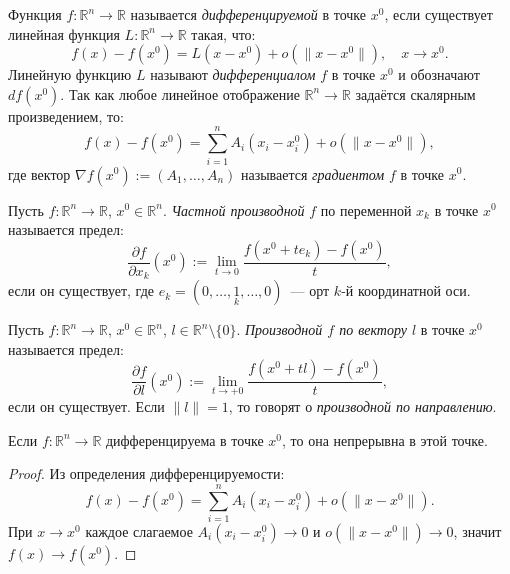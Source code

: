 


\begin{defn}
  Функция $f : \mathbb{R}^n \to \mathbb{R}$ называется \textit{дифференцируемой}
  в точке $x^0$, если существует линейная функция $L : \mathbb{R}^n \to \mathbb{R}$
  такая, что:
  \[
    f(x) - f(x^0) = L(x - x^0) + o(\|x - x^0\|), \quad x \to x^0.
  \]
  Линейную функцию $L$ называют \textit{дифференциалом} $f$ в точке $x^0$
  и обозначают $df(x^0)$. Так как любое линейное отображение
  $\mathbb{R}^n \to \mathbb{R}$ задаётся скалярным произведением, то:
  \[
    f(x) - f(x^0) = \sum_{i=1}^n A_i(x_i - x_i^0) + o(\|x - x^0\|),
  \]
  где вектор $\nabla f(x^0) := (A_1, \ldots, A_n)$ называется
  \textit{градиентом} $f$ в точке $x^0$.
\end{defn}

\begin{defn}
  Пусть $f : \mathbb{R}^n \to \mathbb{R}$, $x^0 \in \mathbb{R}^n$.
  \textit{Частной производной} $f$ по переменной $x_k$ в точке $x^0$
  называется предел:
  \[
    \frac{\partial f}{\partial x_k}(x^0)
    := \lim_{t \to 0}
       \frac{f(x^0 + t e_k) - f(x^0)}{t},
  \]
  если он существует, где $e_k = (0,\ldots,\underset{k}{1},\ldots,0)$~---
  орт $k$-й координатной оси.
\end{defn}

\begin{defn}
  Пусть $f : \mathbb{R}^n \to \mathbb{R}$, $x^0 \in \mathbb{R}^n$,
  $l \in \mathbb{R}^n \setminus \{0\}$.
  \textit{Производной $f$ по вектору $l$} в точке $x^0$ называется предел:
  \[
    \frac{\partial f}{\partial l}(x^0)
    := \lim_{t \to +0} \frac{f(x^0 + tl) - f(x^0)}{t},
  \]
  если он существует. Если $\|l\| = 1$, то говорят о
  \textit{производной по направлению}.
\end{defn}

\begin{theorem}
  Если $f : \mathbb{R}^n \to \mathbb{R}$ дифференцируема в точке $x^0$,
  то она непрерывна в этой точке.
  \begin{proof}
    Из определения дифференцируемости:
    \[
      f(x) - f(x^0)
      = \sum_{i=1}^n A_i(x_i - x_i^0) + o(\|x - x^0\|).
    \]
    При $x \to x^0$ каждое слагаемое $A_i(x_i - x_i^0) \to 0$
    и $o(\|x - x^0\|) \to 0$, значит $f(x) \to f(x^0)$.
  \end{proof}
\end{theorem}

